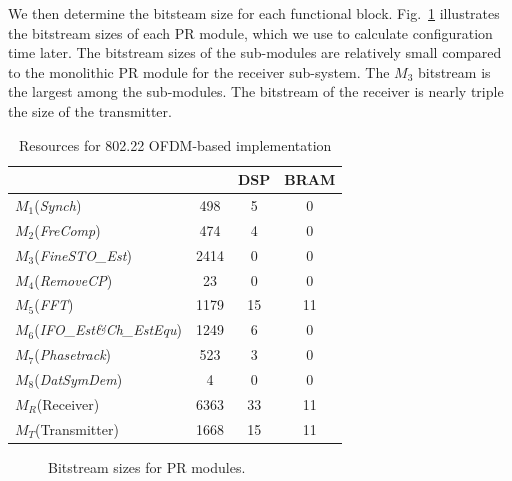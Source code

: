 We then determine the bitsteam size for each functional block.  Fig.~\ref{fig:Bitstream} illustrates the bitstream sizes of each PR module, which we use to calculate configuration time later. The bitstream sizes of the sub-modules are relatively small compared to the monolithic PR module for the receiver sub-system. The $M_3$ bitstream is the largest among the sub-modules. The bitstream of the receiver is nearly triple the size of the transmitter.
\begin{table}[hb]
	\centering
	\caption{Resources for 802.22 OFDM-based implementation}
	\label{tab:Resouces}
	\begin{tabular}{l|c|c|c}
        \hline \hline
    			  \makebox[1.2cm][c]{$modules$}	&  \makebox[1cm][c]{Slices}  &  {DSP} &  {BRAM} \\
	\hline
		$M_1$(\textit{Synch})     				& 498 		& 5	& 0 \\
		$M_2$(\textit{FreComp})				& 474		& 4 	& 0 \\
		$M_3$(\textit{FineSTO\_Est})			& 2414	& 0 	& 0 \\
		$M_4$(\textit{RemoveCP})			& 23  		& 0	& 0 \\
		$M_5$(\textit{FFT})	  			& 1179  	& 15	& 11 \\
		$M_6$(\textit{IFO\_Est\&Ch\_EstEqu})	  	& 1249 	& 6	& 0 \\
		$M_7$(\textit{Phasetrack})	  		& 523  	& 3	& 0 \\
		$M_8$(\textit{DatSymDem})	  		& 4	  	& 0	& 0 \\
		$M_R$(Receiver)  					& 6363  	& 33	& 11 \\
		$M_T$(Transmitter)					& 1668  	& 15	& 11 \\
	\hline \hline
    \end{tabular}
\end{table}

\begin{figure}
\centering
{}
\caption{Bitstream sizes for PR modules.}
\label{fig:Bitstream}
\end{figure}

